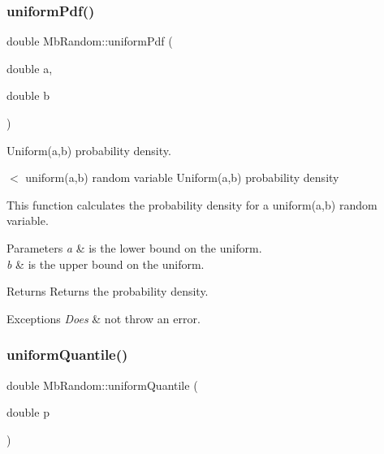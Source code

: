 \subsubsection{\texorpdfstring{uniformPdf()}{uniformPdf()}\hspace{0.1cm}{\footnotesize\ttfamily [2/2]}}
{\footnotesize\ttfamily double Mb\+Random\+::uniform\+Pdf (\begin{DoxyParamCaption}\item[{double}]{a,  }\item[{double}]{b }\end{DoxyParamCaption})\hspace{0.3cm}{\ttfamily [inline]}}



Uniform(a,b) probability density. 

$<$ uniform(a,b) random variable Uniform(a,b) probability density

This function calculates the probability density for a uniform(a,b) random variable.


\begin{DoxyParams}{Parameters}
{\em a} & is the lower bound on the uniform. \\
\hline
{\em b} & is the upper bound on the uniform. \\
\hline
\end{DoxyParams}
\begin{DoxyReturn}{Returns}
Returns the probability density. 
\end{DoxyReturn}

\begin{DoxyExceptions}{Exceptions}
{\em Does} & not throw an error. \\
\hline
\end{DoxyExceptions}
\mbox{\label{class_mb_random_ade8b412ea092c006f041ac7034e9b102}} 
\subsubsection{\texorpdfstring{uniformQuantile()}{uniformQuantile()}\hspace{0.1cm}{\footnotesize\ttfamily [1/2]}}
{\footnotesize\ttfamily double Mb\+Random\+::uniform\+Quantile (\begin{DoxyParamCaption}\item[{double}]{p }\end{DoxyParamCaption})\hspace{0.3cm}{\ttfamily [inline]}}



